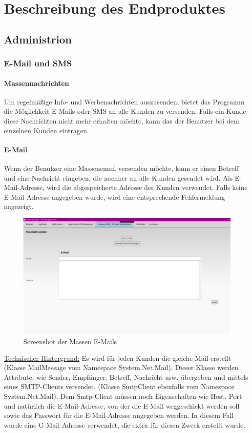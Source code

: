 \chapter{Beschreibung des Endproduktes}\label{cha:theoretical-background}
\section{Administrion}
\subsection{E-Mail und SMS}
\subsubsection{Massennachrichten}
Um regelmäßige Info- und Werbenachrichten auszusenden, bietet das Programm die Möglichkeit E-Mails oder SMS an alle Kunden zu versenden. Falls ein Kunde diese Nachrichten nicht mehr erhalten möchte, kann das der Benutzer bei dem einzelnen Kunden eintragen.
\subsubsection{E-Mail}
Wenn der Benutzer eine Massenemail versenden möchte, kann er einen Betreff und eine Nachricht eingeben, die nachher an alle Kunden gesendet wird. Als E-Mail-Adresse, wird die abgespeicherte Adresse des Kunden verwendet. Falls keine E-Mail-Adresse angegeben wurde, wird eine entsprechende Fehlermeldung angezeigt.

\begin{figure}[H]
\begin{center}
	\includegraphics[scale=.25]{images/Massenemail.png}
\end{center}
	\caption{Screenshot der Massen E-Mails}
	\label{fig:sample}
\end{figure}
\underline{Technischer Hintergrund:}
\medskip
\linebreak
Es wird für jeden Kunden die gleiche Mail erstellt (Klasse MailMessage vom Namespace System.Net.Mail). Dieser Klasse werden Attribute, wie Sender, Empfänger, Betreff, Nachricht usw. übergeben und mittels eines SMTP-Clients versendet. (Klasse SmtpClient ebenfalls vom Namespace System.Net.Mail). Dem Smtp-Client müssen noch Eigenschaften wie Host, Port und natürlich die E-Mail-Adresse, von der die E-Mail weggeschickt werden soll sowie das Passwort für die E-Mail-Adresse angegeben werden. In diesem Fall wurde eine G-Mail-Adresse verwendet, die extra für diesen Zweck erstellt wurde.

